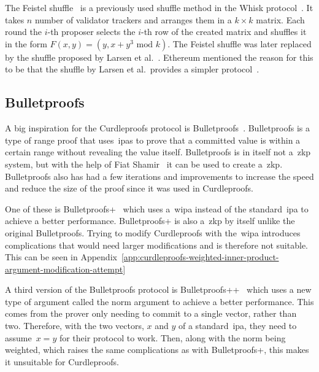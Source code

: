 The Feistel shuffle~\cite{Feistle} is a previously used shuffle method in the Whisk protocol~\cite{Whisk2024}.
It takes $n$ number of validator trackers and arranges them in a $k\times k$ matrix.
Each round the $i$-th proposer selects the $i$-th row of the created matrix and shuffles it in the form $F(x,y)=(y,x+y^3\text{ mod }k)$.
The Feistel shuffle was later replaced by the shuffle proposed by Larsen et al.~\cite{cryptoeprint:2022/560}.
Ethereum mentioned the reason for this to be that the shuffle by Larsen et al.\ provides a simpler protocol~\cite{Whisk2024}.

\subsection{Bulletproofs}\label{subsec:related-work-bulletproofs}
A big inspiration for the Curdleproofs protocol is Bulletproofs~\cite{bunz2018bulletproofs}.
Bulletproofs is a type of range proof that uses~\glspl{ipa} to prove that a committed value is within a certain range without revealing the value itself.
Bulletproofs is in itself not a~\gls{zkp} system, but with the help of Fiat Shamir~\cite{bunz2018bulletproofs} it can be used to create a~\gls{zkp}.
Bulletproofs also has had a few iterations and improvements to increase the speed and reduce the size of the proof since it was used in Curdleproofs.

One of these is Bulletproofs+~\cite{chung2022bulletproofs+} which uses a~\gls{wipa} instead of the standard~\gls{ipa} to achieve a better performance.
Bulletproofs+ is also a~\gls{zkp} by itself unlike the original Bulletproofs.
Trying to modify Curdleproofs with the~\gls{wipa} introduces complications that would need larger modifications and is therefore not suitable.
This can be seen in Appendix~\ref{app:curdleproofs-weighted-inner-product-argument-modification-attempt}

A third version of the Bulletproofs protocol is Bulletproofs++~\cite{eagen2024bulletproofs++} which uses a new type of argument called the norm argument to achieve a better performance.
This comes from the prover only needing to commit to a single vector, rather than two.
Therefore, with the two vectors, $x$ and $y$ of a standard~\gls{ipa}, they need to assume~$x=y$ for their protocol to work.
Then, along with the norm being weighted, which raises the same complications as with Bulletproofs+, this makes it unsuitable for Curdleproofs.